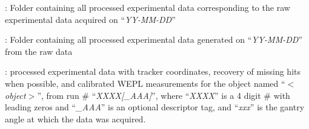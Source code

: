 \documentclass[landscape,12pt]{article}
\begin{document}
\begin{myEnumerate}[labelindent=1pt, leftmargin=*]
    \item {} \color{Black}: Folder containing all processed experimental data corresponding to the raw experimental data acquired on ``\textit{YY-MM-DD}''
    \begin{myEnumerate}[labelindent=1pt, leftmargin=*]
        \item {} \color{Black}: Folder containing all processed experimental data generated on ``\textit{YY-MM-DD}'' from the raw data
        \begin{myEnumerate}[labelindent=1pt, leftmargin=*]
            \item {} \color{Black}: processed experimental data with tracker coordinates, recovery of missing hits when possible, and calibrated WEPL measurements for the object named ``\textit{$<$object$>$}'', from run \# ``\textit{XXXX[\_AAA]}'', where ``\textit{XXXX}'' is a 4 digit \# with leading zeros and ``\textit{\_AAA}'' is an optional descriptor tag, and ``\textit{xxx}'' is the gantry angle at which the data was acquired.
        \end{myEnumerate}
    \end{myEnumerate}
\end{myEnumerate}
\baylorsection

\end{document}
